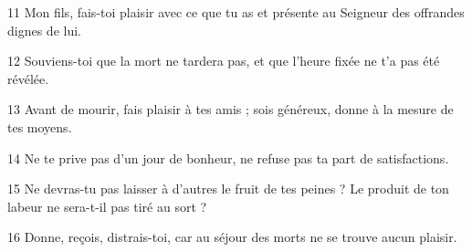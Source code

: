 
11 Mon fils, fais-toi plaisir avec ce que tu as et présente au Seigneur des offrandes dignes de lui.

12 Souviens-toi que la mort ne tardera pas, et que l’heure fixée ne t’a pas été révélée.

13 Avant de mourir, fais plaisir à tes amis ; sois généreux, donne à la mesure de tes moyens.

14 Ne te prive pas d’un jour de bonheur, ne refuse pas ta part de satisfactions.

15 Ne devras-tu pas laisser à d’autres le fruit de tes peines ? Le produit de ton labeur ne sera-t-il pas tiré au sort ?

16 Donne, reçois, distrais-toi, car au séjour des morts ne se trouve aucun plaisir.
